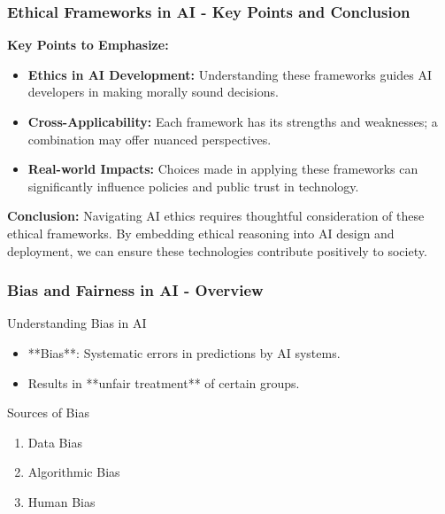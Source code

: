 \documentclass[aspectratio=169]{beamer}
\begin{document}
\begin{frame}[fragile]
    \frametitle{Ethical Frameworks in AI - Key Points and Conclusion}
    \textbf{Key Points to Emphasize:}
    \begin{itemize}
        \item \textbf{Ethics in AI Development:} Understanding these frameworks guides AI developers in making morally sound decisions.
        \item \textbf{Cross-Applicability:} Each framework has its strengths and weaknesses; a combination may offer nuanced perspectives.
        \item \textbf{Real-world Impacts:} Choices made in applying these frameworks can significantly influence policies and public trust in technology.
    \end{itemize}
    
    \textbf{Conclusion:}
    Navigating AI ethics requires thoughtful consideration of these ethical frameworks. By embedding ethical reasoning into AI design and deployment, we can ensure these technologies contribute positively to society.
\end{frame}

\begin{frame}[fragile]
    \frametitle{Bias and Fairness in AI - Overview}
    \begin{block}{Understanding Bias in AI}
        \begin{itemize}
            \item **Bias**: Systematic errors in predictions by AI systems.
            \item Results in **unfair treatment** of certain groups.
        \end{itemize}
    \end{block}
    \begin{block}{Sources of Bias}
        \begin{enumerate}
            \item Data Bias
            \item Algorithmic Bias
            \item Human Bias
        \end{enumerate}
    \end{block}
\end{frame}
\end{document}
